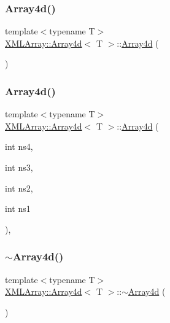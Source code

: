 \subsubsection{\texorpdfstring{Array4d()}{Array4d()}\hspace{0.1cm}{\footnotesize\ttfamily [4/9]}}
{\footnotesize\ttfamily template$<$typename T$>$ \\
\mbox{\hyperlink{classXMLArray_1_1Array4d}{X\+M\+L\+Array\+::\+Array4d}}$<$ T $>$\+::\mbox{\hyperlink{classXMLArray_1_1Array4d}{Array4d}} (\begin{DoxyParamCaption}{ }\end{DoxyParamCaption})\hspace{0.3cm}{\ttfamily [inline]}}

\mbox{\label{classXMLArray_1_1Array4d_a409005374380cbfb8553f3237db7990b}} 
\subsubsection{\texorpdfstring{Array4d()}{Array4d()}\hspace{0.1cm}{\footnotesize\ttfamily [5/9]}}
{\footnotesize\ttfamily template$<$typename T$>$ \\
\mbox{\hyperlink{classXMLArray_1_1Array4d}{X\+M\+L\+Array\+::\+Array4d}}$<$ T $>$\+::\mbox{\hyperlink{classXMLArray_1_1Array4d}{Array4d}} (\begin{DoxyParamCaption}\item[{int}]{ns4,  }\item[{int}]{ns3,  }\item[{int}]{ns2,  }\item[{int}]{ns1 }\end{DoxyParamCaption})\hspace{0.3cm}{\ttfamily [inline]}, {\ttfamily [explicit]}}

\mbox{\label{classXMLArray_1_1Array4d_a80523fcfbd3cf8493a2f5928dd9a3f15}} 
\subsubsection{\texorpdfstring{$\sim$Array4d()}{~Array4d()}\hspace{0.1cm}{\footnotesize\ttfamily [2/3]}}
{\footnotesize\ttfamily template$<$typename T$>$ \\
\mbox{\hyperlink{classXMLArray_1_1Array4d}{X\+M\+L\+Array\+::\+Array4d}}$<$ T $>$\+::$\sim$\mbox{\hyperlink{classXMLArray_1_1Array4d}{Array4d}} (\begin{DoxyParamCaption}{ }\end{DoxyParamCaption})\hspace{0.3cm}{\ttfamily [inline]}}

